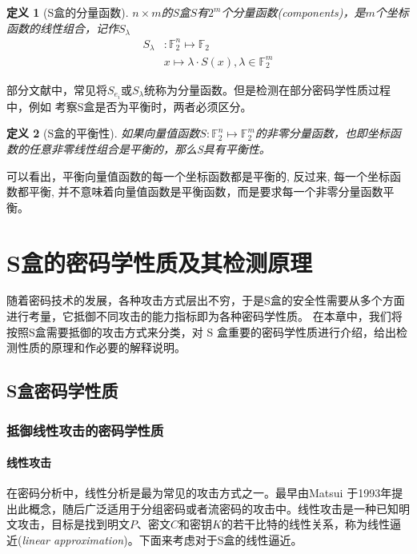 \documentclass{xduugthesis}
\newtheorem{definition}{定义}
\begin{document}
\begin{definition}[S盒的分量函数]
    $n \times m$的S盒$S$有$2^m$个分量函数(\emph{components})，是$m$个坐标函数的线性组合，记作$S_{\lambda}$
    \begin{align*}
        S_{\lambda}& :\mathbb{F}_2^n \mapsto \mathbb{F}_2 \\
        & x \mapsto \lambda \cdot S(x),\lambda \in \mathbb{F}_2^m
    \end{align*}
\end{definition}\par
部分文献中，常见将$S_{e_i}$或$S_{\lambda}$统称为分量函数。但是检测在部分密码学性质过程中，例如
考察S盒是否为平衡时，两者必须区分。
\begin{definition}[S盒的平衡性]
    如果向量值函数$S:\mathbb{F}_2^n \mapsto \mathbb{F}_2^m$的非零分量函数，也即坐标函数的任意非零线性组合是平衡的，那么S具有平衡性。
\end{definition}
可以看出，平衡向量值函数的每一个坐标函数都是平衡的, 反过来, 每一个坐标函数都平衡, 并不意味着向量值函数是平衡函数，而是要求每一个非零分量函数平衡。


\chapter{S盒的密码学性质及其检测原理}
随着密码技术的发展，各种攻击方式层出不穷，于是S盒的安全性需要从多个方面进行考量，它抵御不同攻击的能力指标即为各种密码学性质。
在本章中，我们将按照S盒需要抵御的攻击方式来分类，对 S 盒重要的密码学性质进行介绍，给出检测性质的原理和作必要的解释说明。
\section{S盒密码学性质}
\subsection{抵御线性攻击的密码学性质}
\subsubsection{线性攻击}
在密码分析中，线性分析是最为常见的攻击方式之一。最早由Matsui\cite{matsui1993linear}
于1993年提出此概念，随后广泛适用于分组密码或者流密码的攻击中。线性攻击是一种已知明文攻击，目标是找到明文$P$、密文$C$和密钥$K$的若干比特的线性关系，称为线性逼近(\emph{linear approximation})。下面来考虑对于S盒的线性逼近。\par
\end{document}
